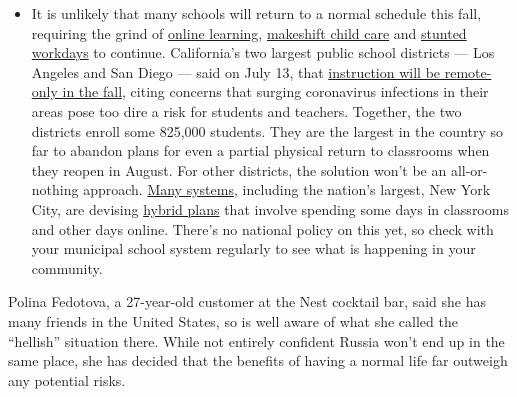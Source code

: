 \begin{itemize}
  \begin{itemize}
  \tightlist
  \item
    It is unlikely that many schools will return to a normal schedule
    this fall, requiring the grind of
    \href{https://www.nytimes.com/2020/06/05/us/coronavirus-education-lost-learning.html?action=click\&pgtype=Article\&state=default\&region=MAIN_CONTENT_3\&context=storylines_faq}{online
    learning},
    \href{https://www.nytimes.com/2020/05/29/us/coronavirus-child-care-centers.html?action=click\&pgtype=Article\&state=default\&region=MAIN_CONTENT_3\&context=storylines_faq}{makeshift
    child care} and
    \href{https://www.nytimes.com/2020/06/03/business/economy/coronavirus-working-women.html?action=click\&pgtype=Article\&state=default\&region=MAIN_CONTENT_3\&context=storylines_faq}{stunted
    workdays} to continue. California's two largest public school
    districts --- Los Angeles and San Diego --- said on July 13, that
    \href{https://www.nytimes.com/2020/07/13/us/lausd-san-diego-school-reopening.html?action=click\&pgtype=Article\&state=default\&region=MAIN_CONTENT_3\&context=storylines_faq}{instruction
    will be remote-only in the fall}, citing concerns that surging
    coronavirus infections in their areas pose too dire a risk for
    students and teachers. Together, the two districts enroll some
    825,000 students. They are the largest in the country so far to
    abandon plans for even a partial physical return to classrooms when
    they reopen in August. For other districts, the solution won't be an
    all-or-nothing approach.
    \href{https://bioethics.jhu.edu/research-and-outreach/projects/eschool-initiative/school-policy-tracker/}{Many
    systems}, including the nation's largest, New York City, are
    devising
    \href{https://www.nytimes.com/2020/06/26/us/coronavirus-schools-reopen-fall.html?action=click\&pgtype=Article\&state=default\&region=MAIN_CONTENT_3\&context=storylines_faq}{hybrid
    plans} that involve spending some days in classrooms and other days
    online. There's no national policy on this yet, so check with your
    municipal school system regularly to see what is happening in your
    community.
  \end{itemize}
\end{itemize}

Polina Fedotova, a 27-year-old customer at the Nest cocktail bar, said
she has many friends in the United States, so is well aware of what she
called the ``hellish'' situation there. While not entirely confident
Russia won't end up in the same place, she has decided that the benefits
of having a normal life far outweigh any potential risks.

